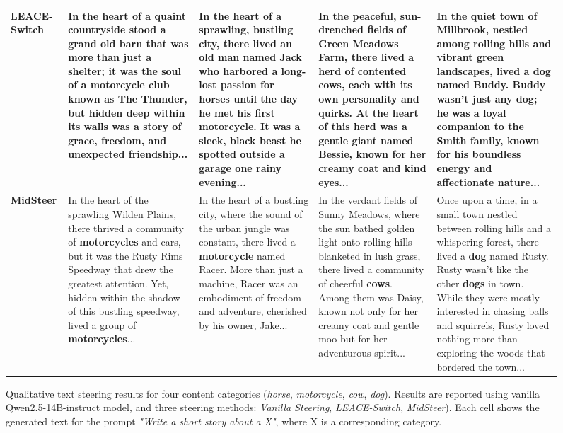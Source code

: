 \begin{figure}[t]
\begin{tabular}{p{} p{} p{} p{} p{}}
        \midrule
        \textbf{LEACE-Switch} &
        In the heart of a quaint countryside stood a grand old barn that was more than just a shelter; it was the soul of a \textbf{motorcycle} club known as The Thunder, but hidden deep within its walls was a story of grace, freedom, and unexpected friendship... &
        In the heart of a sprawling, bustling city, there lived an old man named Jack who harbored a long-lost passion for \textbf{horses} until the day he met his first \textbf{motorcycle}. It was a sleek, black \textbf{beast} he spotted outside a garage one rainy evening... &
        In the peaceful, sun-drenched fields of Green Meadows Farm, there lived a herd of contented \textbf{cows}, each with its own personality and quirks. At the heart of this herd was a gentle giant named Bessie, known for her creamy coat and kind eyes... &
        In the quiet town of Millbrook, nestled among rolling hills and vibrant green landscapes, lived a \textbf{dog} named Buddy. Buddy wasn’t just any \textbf{dog}; he was a loyal companion to the Smith family, known for his boundless energy and affectionate nature... \\
        \midrule
        \textbf{MidSteer} &
        In the heart of the sprawling Wilden Plains, there thrived a community of \textbf{motorcycles} and cars, but it was the Rusty Rims Speedway that drew the greatest attention. Yet, hidden within the shadow of this bustling speedway, lived a group of \textbf{motorcycles}... &
        In the heart of a bustling city, where the sound of the urban jungle was constant, there lived a \textbf{motorcycle} named Racer. More than just a machine, Racer was an embodiment of freedom and adventure, cherished by his owner, Jake... &
        In the verdant fields of Sunny Meadows, where the sun bathed golden light onto rolling hills blanketed in lush grass, there lived a community of cheerful \textbf{cows}. Among them was Daisy, known not only for her creamy coat and gentle moo but for her adventurous spirit... &
        Once upon a time, in a small town nestled between rolling hills and a whispering forest, there lived a \textbf{dog} named Rusty. Rusty wasn't like the other \textbf{dogs} in town. While they were mostly interested in chasing balls and squirrels, Rusty loved nothing more than exploring the woods that bordered the town... \\
    \end{tabular}
    \caption{Qualitative text steering results for four content categories (\textit{horse}, \textit{motorcycle}, \textit{cow}, \textit{dog}). Results are reported using vanilla Qwen2.5-14B-instruct model, and three steering methods: \textit{Vanilla Steering}, \textit{LEACE-Switch}, \textit{MidSteer}). Each cell shows the generated text for the prompt \textit{"Write a short story about a {X}"}, where X is a corresponding category.}
    \label{fig:text_qualitative_full}
\end{figure}